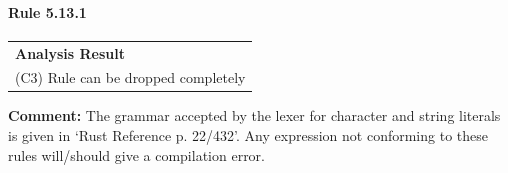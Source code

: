 \paragraph{Rule 5.13.1}
\begin{longtable}{p{13cm}}
\textbf{Analysis Result} \\
(C3) Rule can be dropped completely \\
\end{longtable}
\textbf{Comment:} The grammar accepted by the lexer for character and string literals is given in `Rust Reference p. 22/432'. Any expression not conforming to these rules will/should give a compilation error. \\


